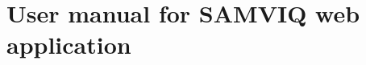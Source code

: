 \graphicspath{{Chapters/Appendices/}}

\chapter{User manual for SAMVIQ web \\ application} %
\label{cha:user_manual_for_samviq_web_application}

